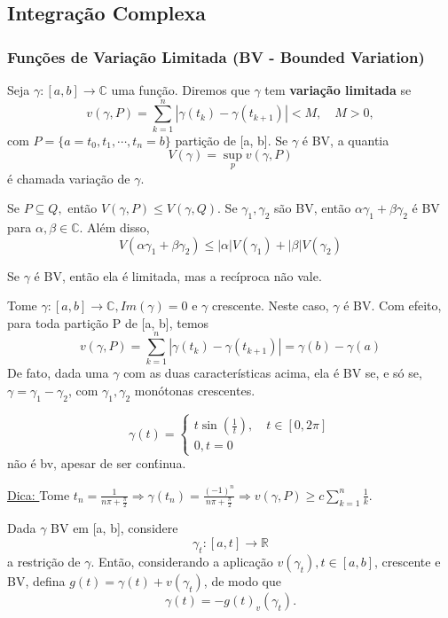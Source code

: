 \documentclass[ComplexAnalysis/complex.tex]{subfiles}
\begin{document}
\subsection{Integração Complexa}
\subsubsection{Funções de Variação Limitada (BV - Bounded Variation)}
\begin{def*}
	Seja $\gamma:[a, b]\rightarrow \mathbb{C}$ uma função. Diremos que $\gamma$ tem \textbf{variação limitada} se
	$$
		v(\gamma, P) = \sum\limits_{k=1}^{n}|\gamma(t_{k}) - \gamma(t_{k+1})| < M, \quad M > 0,
	$$
	com $P = \{a=t_{0}, t_1, \cdots, t_n = b\} $ partição de [a, b]. Se $\gamma$ é BV, a quantia
	$$
		V(\gamma) = \sup_p v(\gamma, P)
	$$
	é chamada variação de $\gamma$.
\end{def*}
\begin{exer*}
	Se $P\subseteq{Q}, $ então $V(\gamma, P)\leq{V(\gamma, Q)}$. Se $\gamma_1, \gamma_2$ são BV, então $\alpha \gamma_1 + \beta \gamma_2$
	é BV para $\alpha, \beta\in \mathbb{C}.$ Além disso,
	$$
		V(\alpha \gamma_1 + \beta \gamma_2) \leq |\alpha|V(\gamma_1) + |\beta|V(\gamma_2)
	$$
\end{exer*}
\begin{exer*}
	Se $\gamma$ é BV, então ela é limitada, mas a recíproca não vale.
\end{exer*}
\begin{example}
	Tome $\gamma:[a, b]\rightarrow \mathbb{C}, Im(\gamma) = 0$ e $\gamma$ crescente. Neste caso, $\gamma$ é BV. Com efeito, para
	toda partição P de [a, b], temos
	$$
		v(\gamma, P) = \sum\limits_{k=1}^{n}|\gamma(t_{k}) - \gamma(t_{k+1})| = \gamma(b) - \gamma(a)
	$$
	De fato, dada uma $\gamma$ com as duas características acima, ela é BV se, e só se, $\gamma = \gamma_1 - \gamma_2$, com
	$\gamma_1, \gamma_2$ monótonas crescentes.
	\begin{exer*}
		$$
			\gamma(t) = \left\{\begin{array}{ll}
				t\sin{(\frac{1}{t})}, \quad t\in[0, 2\pi] \\
				0, t= 0
			\end{array}\right.
		$$
		não é bv, apesar de ser con\'tinua.

		\underline{Dica: } Tome $t_{n} =\displaystyle \frac{1}{n\pi + \frac{\pi}{2}}\Rightarrow \gamma(t_{n}) =\displaystyle \frac{(-1)^n}{n\pi + \frac{\pi}{2}}\Rightarrow
			v(\gamma, P) \geq c \sum\limits_{k=1}^{n}\frac{1}{k}.$
	\end{exer*}
\end{example}
Dada $\gamma$ BV em [a, b], considere
$$
	\gamma_t:[a, t]\rightarrow \mathbb{R}
$$
a restrição de $\gamma.$ Então, considerando a aplicação $v(\gamma_t), t\in[a, b]$, crescente e BV, defina $
	g(t) = \gamma(t) + v(\gamma_t)$, de modo que
$$
	\gamma(t) = -g(t) _ v(\gamma_t).
$$
\end{document}
